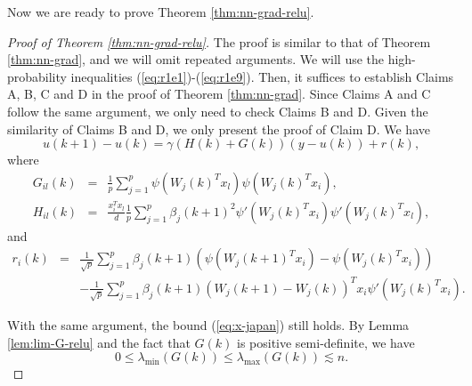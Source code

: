 Now we are ready to prove Theorem \ref{thm:nn-grad-relu}.
\begin{proof}[Proof of Theorem \ref{thm:nn-grad-relu}]
The proof is similar to that of Theorem \ref{thm:nn-grad}, and we will omit repeated arguments. We will use the high-probability inequalities (\ref{eq:r1e1})-(\ref{eq:r1e9}). Then, it suffices to establish Claims A, B, C and D in the proof of Theorem \ref{thm:nn-grad}. Since Claims A and C follow the same argument, we only need to check Claims B and D. Given the similarity of Claims B and D, we only present the proof of Claim D. 
We have
\begin{equation}
u(k+1)-u(k)=\gamma(H(k)+G(k))(y-u(k))+r(k), \label{eq:iter-u-relu}
\end{equation}
where
\begin{eqnarray*}
G_{il}(k) &=& \frac{1}{p}\sum_{j=1}^p\psi(W_j(k)^Tx_l)\psi(W_j(k)^Tx_i), \\
H_{il}(k) &=& \frac{x_i^Tx_l}{d}\frac{1}{p}\sum_{j=1}^p\beta_j(k+1)^2\psi'(W_j(k)^Tx_i)\psi'(W_j(k)^Tx_l),
\end{eqnarray*}
and
\begin{eqnarray*}
r_i(k) &=& \frac{1}{\sqrt{p}}\sum_{j=1}^p\beta_j(k+1)\left(\psi(W_j(k+1)^Tx_i)-\psi(W_j(k)^Tx_i)\right) \\
&& - \frac{1}{\sqrt{p}}\sum_{j=1}^p\beta_j(k+1)(W_j(k+1)-W_j(k))^Tx_i\psi'(W_j(k)^Tx_i).
\end{eqnarray*}


With the same argument, the bound (\ref{eq:x-japan}) still holds. 
By Lemma \ref{lem:lim-G-relu} and the fact that $G(k)$ is positive semi-definite, we have
\begin{equation}
0 \leq \lambda_{\min}(G(k)) \leq \lambda_{\max}(G(k)) \lesssim n. \label{eq:Gk-spec}
\end{equation}


\end{proof}
